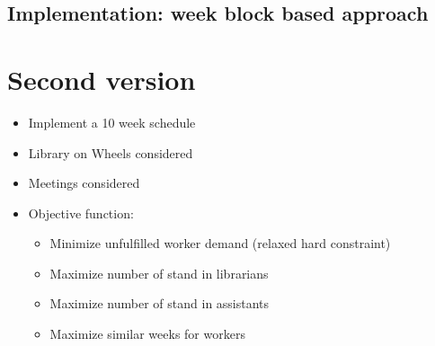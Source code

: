 \documentclass{article}
\begin{document}
	\subsection*{Implementation: week block based approach} 
	
	\section*{Second version }
	\begin{itemize}
		\item Implement a 10 week schedule
		\item Library on Wheels considered
		\item Meetings considered
		\item Objective function:
				\begin{itemize}
				\item Minimize unfulfilled worker demand (relaxed hard constraint)
				\item Maximize number of stand in librarians
				\item Maximize number of stand in assistants
				\item Maximize similar weeks for workers
				\end{itemize}
				
	\end{itemize}
	
	
\end{document}
